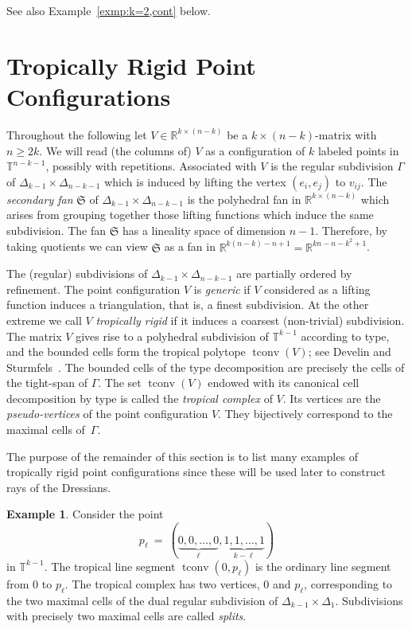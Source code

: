 \documentclass[11pt,a4paper]{amsart}
\newcommand{\RR}{{\mathbb{R}}}
\newcommand{\frS}{\mathfrak{S}}
\DeclareMathOperator{\tconv}{tconv}
\newcommand{\TT}{{\mathbb{T}}}
\theoremstyle{plain}
\theoremstyle{definition}
\newtheorem{example}[theorem]{Example}
\begin{document}
See also Example~\ref{exmp:k=2,cont} below.

\section{Tropically Rigid Point Configurations}\label{sec:trop-rid}

Throughout the following let $V\in\RR^{k\times(n-k)}$ be a $k\times(n-k)$-matrix with $n\ge 2k$.  We
will read (the columns of) $V$ as a configuration of $k$ labeled points in $\TT^{n-k-1}$, possibly with
repetitions.  Associated with $V$ is the regular subdivision $\Gamma$ of
$\Delta_{k-1}\times\Delta_{n-k-1}$ which is induced by lifting the vertex $(e_i,e_j)$ to $v_{ij}$.
The \emph{secondary fan} $\frS$ of $\Delta_{k-1}\times\Delta_{n-k-1}$ is the polyhedral fan in
$\RR^{k\times (n-k)}$ which arises from grouping together those lifting functions which induce the
same subdivision. The fan $\frS$ has a lineality space of dimension $n-1$.  Therefore, by taking
quotients we can view $\frS$ as a fan in $\RR^{k(n-k)-n+1}=\RR^{kn-n-k^2+1}$.

The (regular) subdivisions of $\Delta_{k-1}\times\Delta_{n-k-1}$ are partially ordered by
refinement.  The point configuration $V$ is \emph{generic} if $V$ considered as a lifting function
induces a triangulation, that is, a finest subdivision.  At the other extreme we call $V$
\emph{tropically rigid} if it induces a coarsest (non-trivial) subdivision.  The matrix $V$ gives
rise to a polyhedral subdivision of $\TT^{k-1}$ according to type, and the bounded cells form the
tropical polytope $\tconv(V)$; see Develin and Sturmfels~\cite[Sec.~3]{DevelinSturmfels04}.  The bounded
cells of the type decomposition are precisely the cells of the tight-span of $\Gamma$.  The set
$\tconv(V)$ endowed with its canonical cell decomposition by type is called the \emph{tropical
  complex} of $V$. Its vertices are the \emph{pseudo-vertices} of the point configuration $V$.  They
bijectively correspond to the maximal cells of~$\Gamma$.

The purpose of the remainder of this section is to list many examples of tropically rigid point
configurations since these will be used later to construct rays of the Dressians.

\begin{example}\label{exmp:splits}
  Consider the point
  \[
  p_\ell \ = \ (\underbrace{0,0,\dots,0}_{\ell},\underbrace{1,1,\dots,1}_{k-\ell})
  \]
  in $\TT^{k-1}$.  The tropical line segment $\tconv(0,p_\ell)$ is the ordinary line segment from
  $0$ to $p_{\ell}$.  The tropical complex has two vertices, $0$ and $p_{\ell}$, corresponding to
  the two maximal cells of the dual regular subdivision of $\Delta_{k-1}\times\Delta_1$.
  Subdivisions with precisely two maximal cells are called \emph{splits}.
\end{example}
\end{document}
